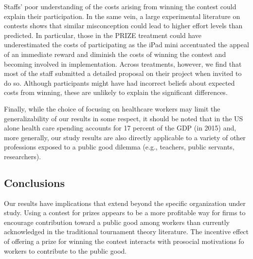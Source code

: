 \documentclass[12pt, titlepage]{article}
\begin{document}
Staffs' poor understanding of the costs arising from winning the contest
could explain their participation. In the same vein, a large
experimental literature on contests \citep{dechenaux2014survey} shows
that similar misconception could lead to higher effort levels than
predicted. In particular, those in the PRIZE treatment could have
underestimated the costs of participating as the iPad mini accentuated
the appeal of an immediate reward and diminish the costs of winning the
contest and becoming involved in implementation. Across treatments,
however, we find that most of the staff submitted a detailed proposal on
their project when invited to do so. Although participants might have
had incorrect beliefs about expected costs from winning, these are
unlikely to explain the significant differences.

Finally, while the choice of focusing on healthcare workers may limit
the generalizability of our results in some respect, it should be noted
that in the US alone health care spending accounts for 17 percent of the
GDP (in 2015) and, more generally, our study results are also directly
applicable to a variety of other professions exposed to a public good
dilemma (e.g., teachers, public servants, researchers).

\subsection{Conclusions}\label{conclusions}

Our results have implications that extend beyond the specific
organization under study. Using a contest for prizes appears to be a
more profitable way for firms to encourage contribution toward a public
good among workers than currently acknowledged in the traditional
tournament theory literature. The incentive effect of offering a prize
for winning the contest interacts with prosocial motivations fo workers
to contribute to the public good.

\renewcommand\refname{References}

\end{document}
